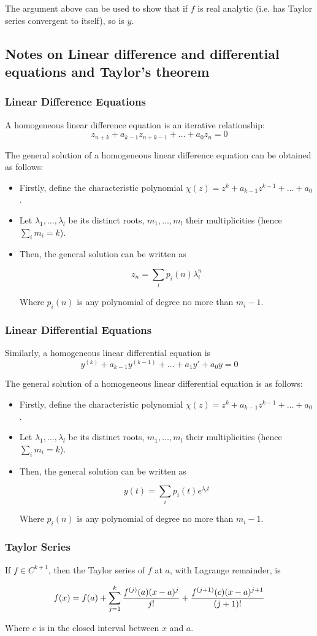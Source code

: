 \documentclass[20pt]{article} %
\theoremstyle{break}
\begin{document}
The argument above can be used to show that if $f$ is real analytic (i.e. has Taylor series convergent to itself), so is $y$.

\subsection{Notes on Linear difference and differential equations and Taylor's theorem}

\subsubsection{Linear Difference Equations}

A homogeneous linear difference equation is an iterative relationship:
\[z_{n+k}+a_{k-1}z_{n+k-1}+\dots+a_0z_n=0\]

The general solution of a homogeneous linear difference equation can be obtained as follows:
\begin{itemize}
\item Firstly, define the characteristic polynomial $\chi(z)=z^k+a_{k-1}z^{k-1}+\dots+a_0$.
\item Let $\lambda_1, \dots, \lambda_l$ be its distinct roots, $m_1, \dots, m_l$ their multiplicities (hence $\sum_im_i=k$).
\item Then, the general solution can be written as

\[z_n=\sum_ip_i(n)\lambda_i^n\]

Where $p_i(n)$ is any polynomial of degree no more than $m_i-1$.
\end{itemize}

\subsubsection{Linear Differential Equations}

Similarly, a homogeneous linear differential equation is
\[y^{(k)}+a_{k-1}y^{(k-1)}+\dots+a_1y'+a_0y=0\]

The general solution of a homogeneous linear differential equation is as follows:
\begin{itemize}
\item Firstly, define the characteristic polynomial $\chi(z)=z^k+a_{k-1}z^{k-1}+\dots+a_0$.
\item Let $\lambda_1, \dots, \lambda_l$ be its distinct roots, $m_1, \dots, m_l$ their multiplicities (hence $\sum_im_i=k$).
\item Then, the general solution can be written as

\[y(t)=\sum_ip_i(t)e^{\lambda_i t}\]

Where $p_i(n)$ is any polynomial of degree no more than $m_i-1$.
\end{itemize}


\subsubsection{Taylor Series}

If $f\in C^{k+1}$, then the Taylor series of $f$ at $a$, with Lagrange remainder, is

\[f(x)=f(a)+\sum_{j=1}^{k}{f^{(j)}(a)(x-a)^j\over j!}+{f^{(j+1)}(c)(x-a)^{j+1}\over(j+1)!}\] 

Where $c$ is in the closed interval between $x$ and $a$.
\end{document}
